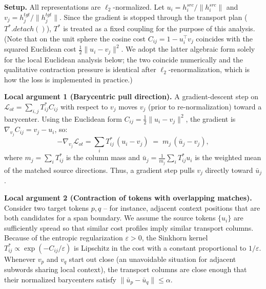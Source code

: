 \documentclass[11pt]{article}
\begin{document}
\textbf{Setup.} All representations are $\ell_2$-normalized. Let $u_i = h_i^{src}/\|h_i^{src}\|$ and $v_j = h_j^{tgt}/\|h_j^{tgt}\|$. Since the gradient is stopped through the transport plan ($T^*.detach()$), $T^*$ is treated as a fixed coupling for the purpose of this analysis. (Note that on the unit sphere the cosine cost $C_{ij}=1-u_i^\top v_j$ coincides with the squared Euclidean cost $\frac12\|u_i-v_j\|^2$. We adopt the latter algebraic form solely for the local Euclidean analysis below; the two coincide numerically and the qualitative contraction pressure is identical after $\ell_2$-renormalization, which is how the loss is implemented in practice.)

\textbf{Local argument 1 (Barycentric pull direction).} A gradient-descent step on $\mathcal{L}_{ot} = \sum_{i,j} T^*_{ij}C_{ij}$ with respect to $v_j$ moves $v_j$ (prior to re-normalization) toward a barycenter. Using the Euclidean form $C_{ij} = \frac{1}{2}\|u_i - v_j\|^2$, the gradient is $\nabla_{v_j} C_{ij} = v_j - u_i$, so:
\begin{equation*}
-\nabla_{v_j}\mathcal{L}_{ot} = \sum_i T^*_{ij}\, (u_i - v_j) \;=\; m_j\,(\bar{u}_j - v_j),
\end{equation*}
where $m_j = \sum_i T^*_{ij}$ is the column mass and $\bar{u}_j = \frac{1}{m_j} \sum_i T^*_{ij} u_i$ is the weighted mean of the matched source directions. Thus, a gradient step pulls $v_j$ directly toward $\bar{u}_j$.

\textbf{Local argument 2 (Contraction of tokens with overlapping matches).} Consider two target tokens $p, q$ -- for instance, adjacent context positions that are both candidates for a span boundary. We assume the source tokens $\{u_i\}$ are sufficiently spread so that similar cost profiles imply similar transport columns. Because of the entropic regularization $\varepsilon > 0$, the Sinkhorn kernel $T^*_{ij} \propto \exp(-C_{ij}/\varepsilon)$ is Lipschitz in the cost with a constant proportional to $1/\varepsilon$. Whenever $v_p$ and $v_q$ start out close (an unavoidable situation for adjacent subwords sharing local context), the transport columns are close enough that their normalized barycenters satisfy $\|\bar{u}_p - \bar{u}_q\| \le \alpha$.
\end{document}
